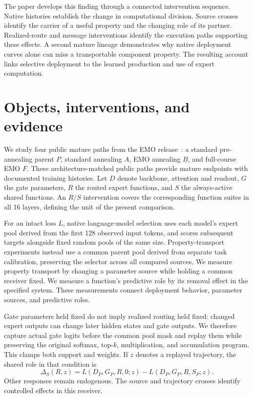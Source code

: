 \documentclass[10pt,twocolumn]{article}
\begin{document}
The paper develops this finding through a connected intervention sequence.
Native histories establish the change in computational division.
Source crosses identify the carrier of a useful property and the changing role of its partner.
Realized-route and message interventions identify the execution paths supporting these effects.
A second mature lineage demonstrates why native deployment curves alone can miss a transportable component property.
The resulting account links selective deployment to the learned production and use of expert computation.

\section{Objects, interventions, and evidence}
We study four public mature paths from the EMO release~\cite{emo}: a standard pre-annealing parent $P$, standard annealing $A$, EMO annealing $B$, and full-course EMO $F$.
These architecture-matched public paths provide mature endpoints with documented training histories.
Let $D$ denote backbone, attention and readout, $G$ the gate parameters, $R$ the routed expert functions, and $S$ the always-active shared functions.
An $R/S$ intervention covers the corresponding function suites in all 16 layers, defining the unit of the present comparison.

For an intact loss $L$, native language-model selection uses each model's expert pool derived from the first 128 observed input tokens, and scores subsequent targets alongside fixed random pools of the same size.
Property-transport experiments instead use a common parent pool derived from separate task calibration, preserving the selector across all compared sources.
We measure property transport by changing a parameter source while holding a common receiver fixed.
We measure a function's predictive role by its removal effect in the specified system.
These measurements connect deployment behavior, parameter sources, and predictive roles.

Gate parameters held fixed do not imply realized routing held fixed: changed expert outputs can change later hidden states and gate outputs.
We therefore capture actual gate logits before the common pool mask and replay them while preserving the original softmax, top-$k$, multiplication, and accumulation program.
This clamps both support and weights.
If $z$ denotes a replayed trajectory, the shared role in that condition is
\begin{equation}
\Delta_S(R,z)=L(D_P,G_P,R,0;z)-L(D_P,G_P,R,S_P;z).
\end{equation}
Other responses remain endogenous.
The source and trajectory crosses identify controlled effects in this receiver.
\end{document}
